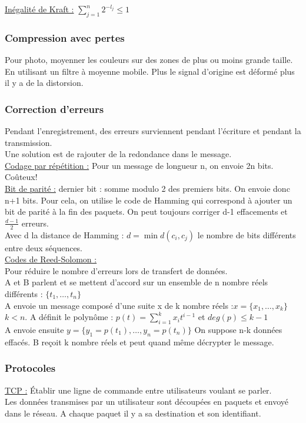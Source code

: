 \documentclass[../main.tex]{subfiles}
\begin{document}
\underline{Inégalité de Kraft :} $\sum_{j=1}^n 2^{-l_j} \leq 1$\\

\subsubsection{Compression avec pertes}
Pour photo, moyenner les couleurs sur des zones de plus ou moins grande taille. En utilisant un filtre à moyenne mobile. Plus le signal d'origine est déformé plus il y a de la distorsion.\\

\subsubsection{Correction d'erreurs}
Pendant l'enregistrement, des erreurs surviennent pendant l'écriture et pendant la transmission.\\
Une solution est de rajouter de la redondance dans le message. \\
\quad \underline{Codage par répétition :} Pour un message de longueur n, on envoie 2n bits. Coûteux!\\

\quad \underline{Bit de parité :} dernier bit : somme modulo 2 des premiers bits. On envoie donc n+1 bits. Pour cela, on utilise le code de Hamming qui correspond à ajouter un bit de parité à la fin des paquets. On peut toujours corriger d-1 effacements et $\frac{d-1}{2}$ erreurs.\\
Avec d la distance de Hamming : $d=\min d(c_i, c_j)$ le nombre de bits différents entre deux séquences.\\

\quad \underline{Codes de Reed-Solomon :}\\
Pour réduire le nombre d'erreurs lors de transfert de données.\\
A et B parlent et se mettent d'accord sur un ensemble de n nombre réels différents : $\{t_1, \dots, t_n\}$\\
A envoie un message composé d'une suite x de k nombre réels :$x = \{x_1, \dots, x_k\}$ $k<n$. A définit le polynôme : $p(t) = \sum_{i=1}^k x_i t^{i-1}$ et $deg(p) \leq k-1$\\
A envoie ensuite $y = \{y_1 = p(t_1), \dots, y_n=p(t_n)\}$ On suppose n-k données effacés. B reçoit k nombre réels et peut quand même décrypter le message.\\

\subsubsection{Protocoles}
\quad \underline{TCP :} Établir une ligne de commande entre utilisateurs voulant se parler.\\
Les données transmises par un utilisateur sont découpées en paquets et envoyé dans le réseau. A chaque paquet il y a sa destination et son identifiant.\\
\end{document}

